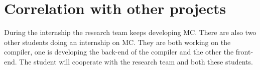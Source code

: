 





\section{Correlation with other projects}
During the internship the research team keeps developing MC.
There are also two other students doing an internship on MC.
They are both working on the compiler, one is developing the back-end of the compiler and the other the front-end.
The student will cooperate with the research team and both these students.







